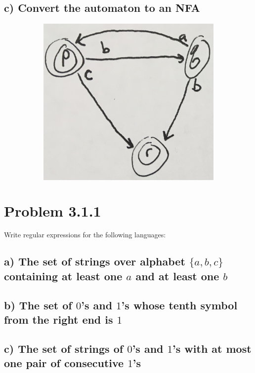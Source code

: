 \documentclass[20pt]{article} %
\begin{document}
\subsection{c) Convert the automaton to an NFA}
\begin{figure}[!htbp]
  	\centering
   	\begin{subfigure}[p]{0.4\linewidth}
    	\includegraphics[width=\linewidth]{./figures/h3-1.jpg}
   	\end{subfigure}
\end{figure} 

\newpage
\section{Problem 3.1.1}
Write regular expressions for the following languages:

\subsection{a) The set of strings over alphabet $\{a,b,c\}$ containing at least one $a$ and at least one $b$}

\subsection{b) The set of $0$'s and $1$'s whose tenth symbol from the right end is $1$}

\subsection{c) The set of strings of $0$'s and $1$'s with at most one pair of consecutive $1$'s}
\end{document}

